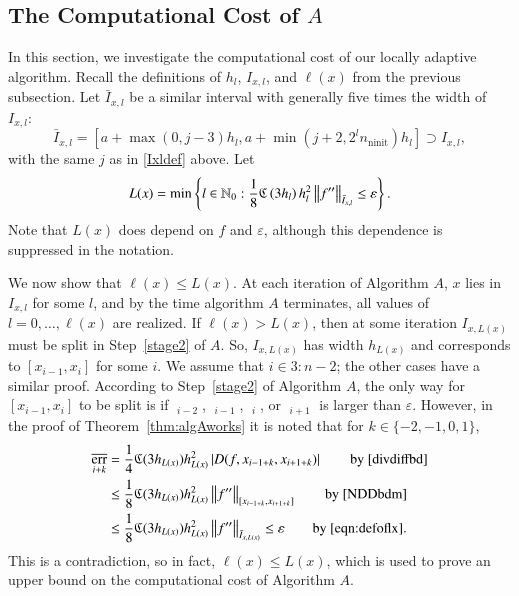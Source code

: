 \documentclass[review]{elsarticle}
\newcommand{\abstol}{\varepsilon}
\theoremstyle{definition}
\newcommand{\Ixl}{I_{x,l}}
\DeclareMathOperator{\ninit}{ninit}
\DeclareMathOperator{\oerr}{\overline{err}}
\begin{document}
\subsection{The Computational Cost of $A$} \label{subsec:appxcost}

In this section, we investigate the computational cost of our locally adaptive
algorithm. Recall the definitions of $h_l$, $\Ixl$, and $\ell(x)$ from the
previous subsection. Let
$\bar{I}_{x,l}$ be a similar interval with generally five times the
width of~$\Ixl$:
\begin{equation}
\bar{I}_{x,l}=\left[a+\max(0,j-3)h_l, a+ \min(j+2,2^l n_{\ninit})h_l\right] \supset \Ixl,
\end{equation}
with the same $j$ as in \eqref{Ixldef} above.  Let
\begin{equation}\label{eqn:defoflx}
L(x) = \min \left\{ l \in \mathbb{N}_0 :  \frac{1}{8} \fC\left(3h_l\right)h_l^2\norm[\bar{I}_{x,l}]{f''} \le \abstol \right\}.
\end{equation}
Note that $L(x)$ does depend on $f$ and $\abstol$, although this dependence is
suppressed in the notation.

We now show that $\ell(x) \le L(x)$. At each iteration of Algorithm $A$, $x$
lies in $\Ixl$ for some $l$, and by the time algorithm $A$ terminates, all
values of $l = 0, \ldots, \ell(x)$ are realized. If $\ell(x) > L(x)$, then at
some iteration $I_{x,L(x)}$ must be split in Step~\ref{stage2} of $A$. So,
$I_{x,L(x)}$ has width $h_{L(x)}$ and corresponds to $[x_{i-1},x_i]$ for some
$i$. We assume that $i \in 3\!:\!n-2$; the other cases have a similar proof.
According to Step~\ref{stage2} of Algorithm $A$, the only way for
$[x_{i-1},x_i]$ to be split is if $\oerr_{i-2}$, $\oerr_{i-1}$, $\oerr_{i}$, or
$\oerr_{i+1}$ is larger than $\abstol$. However, in the proof of
Theorem~\ref{thm:algAworks} it is noted that for $k \in \{-2, -1, 0, 1\}$,
\begin{align}
\nonumber
\oerr_{i+k} & = \frac{1}4 \fC(3h_{L(x)}) h_{L(x)}^2 \abs{D(f,x_{i-1+k},x_{i+1+k})} \qquad
\text{by \eqref{divdiffbd}} \\
\nonumber
& \le \frac{1} 8  \fC(3h_{L(x)}) h_{L(x)}^2\norm[{[x_{i-1+k},x_{i+1+k}]}]{f''}  \qquad
\text{by \eqref{NDDbdm}}\\
& \le \frac{1} 8  \fC(3h_{L(x)}) h_{L(x)}^2 \norm[\bar{I}_{x,L(x)}]{f''} \le \varepsilon \qquad
\text{by \eqref{eqn:defoflx}}. \label{oerrbd}
\end{align}
This is a contradiction, so in fact, $\ell(x) \le L(x)$, which is used to prove an upper
bound on the
computational cost of Algorithm $A$.
\end{document}
